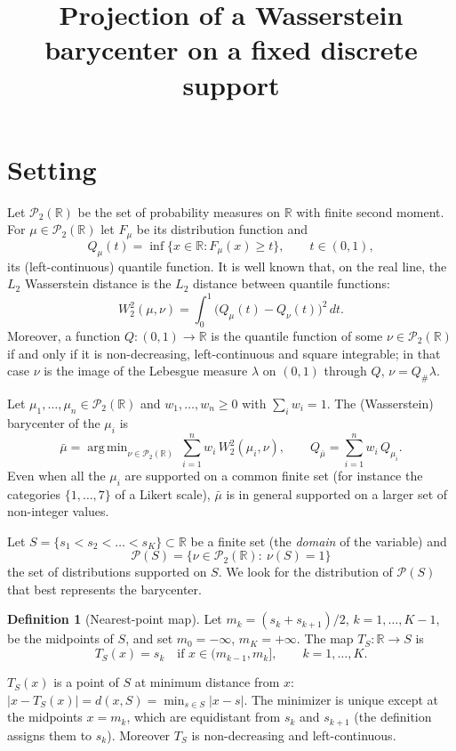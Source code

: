 \documentclass[11pt,a4paper]{article}
\title{Projection of a Wasserstein barycenter on a fixed discrete support}
\author{}
\date{}
\theoremstyle{definition}
\newtheorem{definition}[theorem]{Definition}
\newcommand{\R}{\mathbb{R}}
\newcommand{\PS}{\mathcal{P}(S)}
\DeclareMathOperator*{\argmin}{arg\,min}
\begin{document}
\maketitle

\section{Setting}

Let $\mathcal{P}_2(\R)$ be the set of probability measures on $\R$ with finite
second moment. For $\mu\in\mathcal{P}_2(\R)$ let $F_\mu$ be its distribution
function and
\[
  Q_\mu(t)=\inf\{x\in\R : F_\mu(x)\ge t\},\qquad t\in(0,1),
\]
its (left-continuous) quantile function. It is well known that, on the real
line, the $L_2$ Wasserstein distance is the $L_2$ distance between quantile
functions:
\begin{equation}\label{eq:W2}
  W_2^2(\mu,\nu)=\int_0^1\big(Q_\mu(t)-Q_\nu(t)\big)^2\,dt .
\end{equation}
Moreover, a function $Q:(0,1)\to\R$ is the quantile function of some
$\nu\in\mathcal{P}_2(\R)$ if and only if it is non-decreasing,
left-continuous and square integrable; in that case $\nu$ is the image of the
Lebesgue measure $\lambda$ on $(0,1)$ through $Q$, $\nu=Q_{\#}\lambda$.

Let $\mu_1,\dots,\mu_n\in\mathcal{P}_2(\R)$ and $w_1,\dots,w_n\ge 0$ with
$\sum_i w_i=1$. The (Wasserstein) barycenter of the $\mu_i$ is
\[
  \bar\mu=\argmin_{\nu\in\mathcal{P}_2(\R)}\ \sum_{i=1}^n w_i\,W_2^2(\mu_i,\nu),
  \qquad Q_{\bar\mu}=\sum_{i=1}^n w_i\,Q_{\mu_i}.
\]
Even when all the $\mu_i$ are supported on a common finite set (for instance
the categories $\{1,\dots,7\}$ of a Likert scale), $\bar\mu$ is in general
supported on a larger set of non-integer values.

Let $S=\{s_1<s_2<\dots<s_K\}\subset\R$ be a finite set (the \emph{domain} of
the variable) and
\[
  \PS=\{\nu\in\mathcal{P}_2(\R):\ \nu(S)=1\}
\]
the set of distributions supported on $S$. We look for the distribution of
$\PS$ that best represents the barycenter.

\begin{definition}[Nearest-point map]
Let $m_k=(s_k+s_{k+1})/2$, $k=1,\dots,K-1$, be the midpoints of $S$, and set
$m_0=-\infty$, $m_K=+\infty$. The map $T_S:\R\to S$ is
\[
  T_S(x)=s_k \quad\text{if } x\in(m_{k-1},m_k],\qquad k=1,\dots,K .
\]
\end{definition}

$T_S(x)$ is a point of $S$ at minimum distance from $x$: $|x-T_S(x)|=d(x,S)=\min_{s\in S}|x-s|$.
The minimizer is unique except at the midpoints $x=m_k$, which are equidistant
from $s_k$ and $s_{k+1}$ (the definition assigns them to $s_k$). Moreover $T_S$
is non-decreasing and left-continuous.
\end{document}

